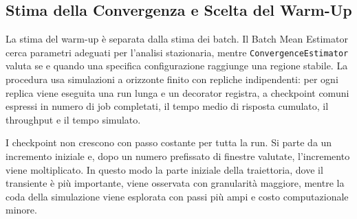 ﻿\documentclass[a4paper,12pt]{article}
\begin{document}
\subsection{Stima della Convergenza e Scelta del Warm-Up}
La stima del warm-up è separata dalla stima dei batch. Il Batch Mean Estimator cerca parametri adeguati per l'analisi stazionaria, mentre \texttt{ConvergenceEstimator} valuta se e quando una specifica configurazione raggiunge una regione stabile. La procedura usa simulazioni a orizzonte finito con repliche indipendenti: per ogni replica viene eseguita una run lunga e un decorator registra, a checkpoint comuni espressi in numero di job completati, il tempo medio di risposta cumulato, il throughput e il tempo simulato.

I checkpoint non crescono con passo costante per tutta la run. Si parte da un incremento iniziale e, dopo un numero prefissato di finestre valutate, l'incremento viene moltiplicato. In questo modo la parte iniziale della traiettoria, dove il transiente è più importante, viene osservata con granularità maggiore, mentre la coda della simulazione viene esplorata con passi più ampi e costo computazionale minore.
\end{document}
